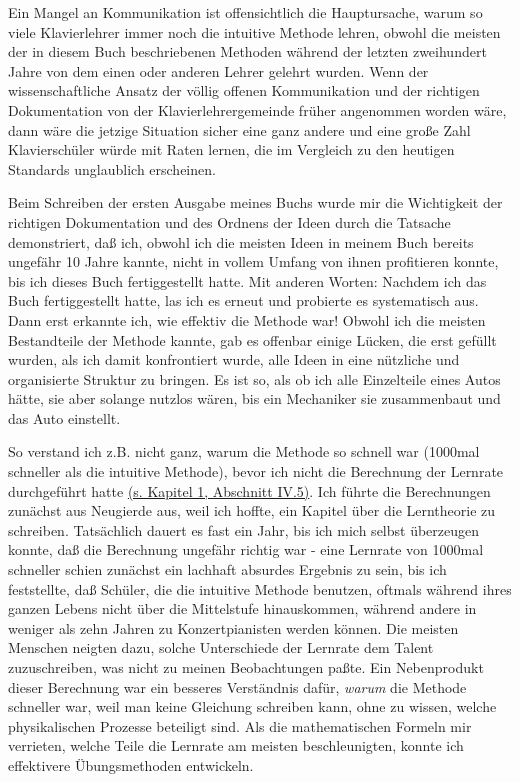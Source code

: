 Ein Mangel an Kommunikation ist offensichtlich die Hauptursache, warum so viele Klavierlehrer immer noch die intuitive Methode lehren, obwohl die meisten der in diesem Buch beschriebenen Methoden während der letzten zweihundert Jahre von dem einen oder anderen Lehrer gelehrt wurden.
 Wenn der wissenschaftliche Ansatz der völlig offenen Kommunikation und der richtigen Dokumentation von der Klavierlehrergemeinde früher angenommen worden wäre, dann wäre die jetzige Situation sicher eine ganz andere und eine große Zahl Klavierschüler würde mit Raten lernen, die im Vergleich zu den heutigen Standards unglaublich erscheinen.
 

Beim Schreiben der ersten Ausgabe meines Buchs wurde mir die Wichtigkeit der richtigen Dokumentation und des Ordnens der Ideen durch die Tatsache demonstriert, daß ich, obwohl ich die meisten Ideen in meinem Buch bereits ungefähr 10 Jahre kannte, nicht in vollem Umfang von ihnen profitieren konnte, bis ich dieses Buch fertiggestellt hatte.
 Mit anderen Worten: Nachdem ich das Buch fertiggestellt hatte, las ich es erneut und probierte es systematisch aus.
 Dann erst erkannte ich, wie effektiv die Methode war!
 Obwohl ich die meisten Bestandteile der Methode kannte, gab es offenbar einige Lücken, die erst gefüllt wurden, als ich damit konfrontiert wurde, alle Ideen in eine nützliche und organisierte Struktur zu bringen.
 Es ist so, als ob ich alle Einzelteile eines Autos hätte, sie aber solange nutzlos wären, bis ein Mechaniker sie zusammenbaut und das Auto einstellt.
 

So verstand ich z.B. nicht ganz, warum die Methode so schnell war (1000mal schneller als die intuitive Methode), bevor ich nicht die Berechnung der Lernrate durchgeführt hatte \hyperlink{c1iv5}{(s. Kapitel 1, Abschnitt IV.5)}.
 Ich führte die Berechnungen zunächst aus Neugierde aus, weil ich hoffte, ein Kapitel über die Lerntheorie zu schreiben.
 Tatsächlich dauert es fast ein Jahr, bis ich mich selbst überzeugen konnte, daß die Berechnung ungefähr richtig war - eine Lernrate von 1000mal schneller schien zunächst ein lachhaft absurdes Ergebnis zu sein, bis ich feststellte, daß Schüler, die die intuitive Methode benutzen, oftmals während ihres ganzen Lebens nicht über die Mittelstufe hinauskommen, während andere in weniger als zehn Jahren zu Konzertpianisten werden können.
 Die meisten Menschen neigten dazu, solche Unterschiede der Lernrate dem Talent zuzuschreiben, was nicht zu meinen Beobachtungen paßte.
 Ein Nebenprodukt dieser Berechnung war ein besseres Verständnis dafür, \textit{warum} die Methode schneller war, weil man keine Gleichung schreiben kann, ohne zu wissen, welche physikalischen Prozesse beteiligt sind.
 Als die mathematischen Formeln mir verrieten, welche Teile die Lernrate am meisten beschleunigten, konnte ich effektivere Übungsmethoden entwickeln.
 

